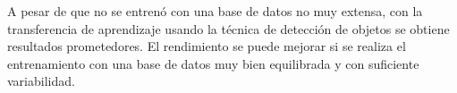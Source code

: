 \begin{tcolorbox}
[colback=blue!5!white,colframe=blue!45!black,fonttitle=\bfseries,title=Conclusión]

A pesar de que no se entrenó con una base de datos no muy extensa, con la transferencia de aprendizaje usando la técnica de detección de objetos se obtiene resultados prometedores.
El rendimiento se puede mejorar si se realiza el entrenamiento con una base de datos muy bien equilibrada y con suficiente variabilidad. 

\end{tcolorbox}\\


